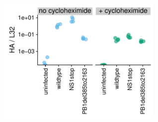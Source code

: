 \documentclass[]{asm-article}
\newcommand{\FIG}[1]{\autoref{fig:#1}}
\newcommand{\SUPPFIG}[1]{\autoref{suppfig:#1}}
\begin{document}
\begin{suppfig}
\includegraphics[width=0.6\textwidth]{figures/Validation_Figure/qpcr_plot.pdf}
\caption{
Validation that the infections in \FIG{validation}B and \SUPPFIG{validationflow}B were performed at similar doses of virions capable of initiating primary transcription.
In this experiment, A549 cells were infected at MOI of 0.4 (based on TCID50 as described in \SUPPFIG{validationflow}B), and then after 8 hours mRNA was harvested for qPCR on oligo-dT primed reverse transcription products.
The y-axis shows the ratio of viral HA mRNA to the housekeeping gene L32.
These infections were performed in the presence of absence of 50 $\mu$g/ml cycloheximide, which blocks protein synthesis and hence secondary transcription by newly synthesized viral proteins.
In the absence of cycloheximide, the viruses with deletions in PB1 produced less viral mRNA presumably because they could not produce PB1 protein for secondary transcription.
But in the presence of cycloheximide, all viruses produced similar amounts of viral mRNA, indicating that the dose of particles active for primary transcription is roughly equivalent across variants.
Each measurement was performed in quadruplicate.
}
\label{suppfig:delqPCR}
\end{suppfig}
\end{document}
